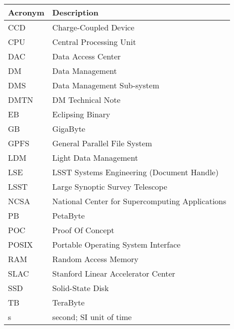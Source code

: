 \addtocounter{table}{-1}
\begin{longtable}{|l|p{}|}\hline
\textbf{Acronym} & \textbf{Description}  \\\hline

CCD&Charge-Coupled Device \\\hline
CPU&Central Processing Unit \\\hline
DAC&Data Access Center \\\hline
DM&Data Management \\\hline
DMS&Data Management Sub-system \\\hline
DMTN&DM Technical Note \\\hline
EB&Eclipsing Binary \\\hline
GB&GigaByte \\\hline
GPFS&General Parallel File System \\\hline
LDM&Light Data Management \\\hline
LSE&LSST Systems Engineering (Document Handle) \\\hline
LSST&Large Synoptic Survey Telescope \\\hline
NCSA&National Center for Supercomputing Applications \\\hline
PB&PetaByte \\\hline
POC&Proof Of Concept \\\hline
POSIX&Portable Operating System Interface \\\hline
RAM&Random Access Memory \\\hline
SLAC&Stanford Linear Accelerator Center \\\hline
SSD&Solid-State Disk \\\hline
TB&TeraByte \\\hline
s&second; SI unit of time \\\hline
\end{longtable}
